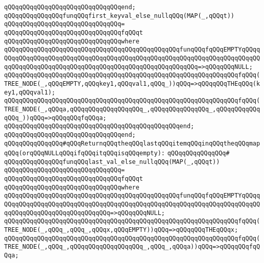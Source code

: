\verb|qQQqqQQqqQQqqQQqqQQqqQQqqQQqqQQqend;|\newline
\newline
\verb|qQQqqQQqqQQqqQQqfunqQQqfirst_keyval_else_nullqQQq(MAP(_,qQQqt))|\newline
\verb|qQQqqQQqqQQqqQQqqQQqqQQqqQQqqQQq=|\newline
\verb|qQQqqQQqqQQqqQQqqQQqqQQqqQQqqQQqfqQQqt|\newline
\verb|qQQqqQQqqQQqqQQqqQQqqQQqqQQqqQQqwhere|\newline
\verb|qQQqqQQqqQQqqQQqqQQqqQQqqQQqqQQqqQQqqQQqqQQqqQQqfunqQQqfqQQqEMPTYqQQqqQQqqQQqqQQqqQQqqQQqqQQqqQQqqQQqqQQqqQQqqQQqqQQqqQQqqQQqqQQqqQQqqQQqqQQqqQQqqQQqqQQqqQQqqQQqqQQqqQQqqQQqqQQqqQQqqQQqqQQqqQQq=>qQQqqQQqNULL;|\newline
\verb|qQQqqQQqqQQqqQQqqQQqqQQqqQQqqQQqqQQqqQQqqQQqqQQqqQQqqQQqqQQqqQQqfqQQq(TREE_NODE(_,qQQqEMPTY,qQQqkey1,qQQqval1,qQQq_))qQQq=>qQQqqQQqTHEqQQq(key1,qQQqval1);|\newline
\verb|qQQqqQQqqQQqqQQqqQQqqQQqqQQqqQQqqQQqqQQqqQQqqQQqqQQqqQQqqQQqqQQqfqQQq(TREE_NODE(_,qQQqa,qQQqqQQqqQQqqQQqqQQq_,qQQqqQQqqQQqqQQq_,qQQqqQQqqQQqqQQq_))qQQq=>qQQqqQQqfqQQqa;|\newline
\verb|qQQqqQQqqQQqqQQqqQQqqQQqqQQqqQQqqQQqqQQqqQQqqQQqend;|\newline
\verb|qQQqqQQqqQQqqQQqqQQqqQQqqQQqqQQqend;|\newline
\newline
\newline
\verb|qQQqqQQqqQQqqQQq#qQQqReturnqQQqtheqQQqlastqQQqitemqQQqinqQQqtheqQQqmapqQQq(orqQQqNULLqQQqifqQQqitqQQqisqQQqempty):|\newline
\verb|qQQqqQQqqQQqqQQq#|\newline
\verb|qQQqqQQqqQQqqQQqfunqQQqlast_val_else_nullqQQq(MAP(_,qQQqt))|\newline
\verb|qQQqqQQqqQQqqQQqqQQqqQQqqQQqqQQq=|\newline
\verb|qQQqqQQqqQQqqQQqqQQqqQQqqQQqqQQqfqQQqt|\newline
\verb|qQQqqQQqqQQqqQQqqQQqqQQqqQQqqQQqwhere|\newline
\verb|qQQqqQQqqQQqqQQqqQQqqQQqqQQqqQQqqQQqqQQqqQQqqQQqfunqQQqfqQQqEMPTYqQQqqQQqqQQqqQQqqQQqqQQqqQQqqQQqqQQqqQQqqQQqqQQqqQQqqQQqqQQqqQQqqQQqqQQqqQQqqQQqqQQqqQQqqQQqqQQqqQQqqQQq=>qQQqqQQqNULL;|\newline
\verb|qQQqqQQqqQQqqQQqqQQqqQQqqQQqqQQqqQQqqQQqqQQqqQQqqQQqqQQqqQQqqQQqfqQQq(TREE_NODE(_,qQQq_,qQQq_,qQQqx,qQQqEMPTY))qQQq=>qQQqqQQqTHEqQQqx;|\newline
\verb|qQQqqQQqqQQqqQQqqQQqqQQqqQQqqQQqqQQqqQQqqQQqqQQqqQQqqQQqqQQqqQQqfqQQq(TREE_NODE(_,qQQq_,qQQqqQQqqQQqqQQqqQQq_,qQQq_,qQQqa))qQQq=>qQQqqQQqfqQQqa;|\newline
